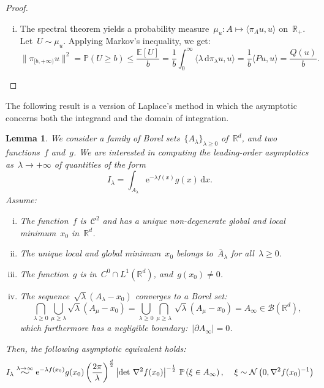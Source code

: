 \documentclass[10pt]{article}
\renewcommand{\d}{\mathrm{d}}
\newcommand{\e}{\mathrm{e}}
\newcommand{\R}{\mathbb{R}}
\newcommand{\1}{\mathbbm 1}
\newcommand{\widesim}[2][1.5]{
  \mathrel{\overset{#2}{\scalebox{#1}[1]{$\sim$}}}
}
\newtheorem{lemma}{Lemma}
\begin{document}
\begin{proof}
\begin{enumerate}[i)]
{            }
            \item{
                The spectral theorem yields a probability measure~$\mu_u : A \mapsto \langle \pi_A u,u\rangle$ on~$\R_+$. Let~$U\sim \mu_u$.
                Applying Markov's inequality, we get:
                \begin{equation}
                    \|\pi_{[b,+\infty)}u\|^2 = \mathbb P (U \geq b) \leq \frac{\mathbb E[U]}{b} = \frac1b\int_0^\infty \langle \lambda\,\d\pi_{\lambda}u,u\rangle = \frac1b\langle Pu,u\rangle = \frac{Q(u)}b.
                \end{equation}
            }
        \end{enumerate}        
    \end{proof}

    The following result is a version of Laplace's method in which the asymptotic concerns both the integrand and the domain of integration.
    \begin{lemma}
        \label{lemma:laplace}
        We consider a family of Borel sets~$\{A_\lambda\}_{\lambda\geq 0}$ of~$\R^d$, and two functions~$f$ and~$g$.
        We are interested in computing the leading-order asymptotics as~$\lambda\to+\infty$ of quantities of the form 
       ~$$I_\lambda = \int_{A_\lambda}\e^{-\lambda f(x)}g(x)\,\d x.$$
        Assume:
        \begin{enumerate}[i)]
            \item{\label{hyp:fc2}The function~$f$ is~$\mathcal C^2$ and has a unique non-degenerate global and local minimum~$x_0$ in~$\R^d$.}
            \item{\label{hyp:strong_min}The unique local and global minimum~$x_0$ belongs to~$\overline A_\lambda$ for all~$\lambda\geq 0$.}
            \item{\label{hyp:gc0}The function~$g$ is in~$C^0\cap L^1 (\R^d)$, and~$g(x_0)\neq 0$.}
            \item{\label{hyp:domain_conv}The sequence~$\sqrt{\lambda}(A_\lambda - x_0)$ converges to a Borel set:~$$\bigcap_{\lambda \geq 0} \bigcup_{\mu\geq\lambda} \sqrt{\lambda}(A_\mu-x_0) = \bigcup_{\lambda \geq 0} \bigcap_{\mu \geq \lambda}\, \sqrt\lambda ( A_\mu - x_0) = A_\infty \in \mathcal{B}(\R^d),$$
            which furthermore has a negligible boundary:~$\left|\partial A_\infty \right|=0$.}
        \end{enumerate}
        Then, the following asymptotic equivalent holds:
        \begin{equation}
            \label{eq:laplace_method}
            I_\lambda \widesim{\lambda\to\infty} \e^{-\lambda f(x_0)}g(x_0)\left(\frac{2\pi}{\lambda}\right)^{\frac d2}\left|\det\,\nabla^2 f(x_0)\right|^{-\frac12}\,\mathbb{P}\left(\xi \in A_\infty\right),\quad\,{\xi\sim \mathcal N\left(0,\nabla^2 f(x_0)^{-1}\right)}
        \end{equation}
    \end{lemma}
\end{document}
